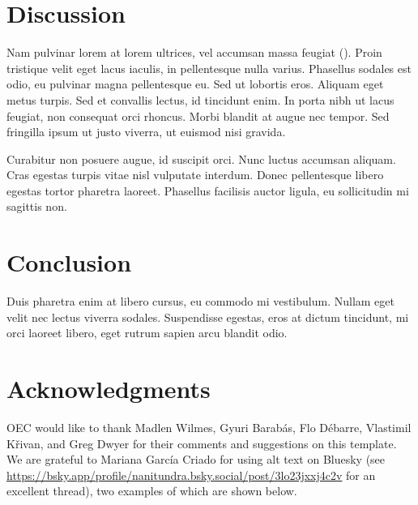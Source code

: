 ﻿\documentclass[11pt]{article}
\begin{document}
\section*{Discussion}

Nam pulvinar lorem at lorem ultrices, vel accumsan massa feugiat (\citealt{Ing11}). Proin tristique velit eget lacus iaculis, in pellentesque nulla varius. Phasellus sodales est odio, eu pulvinar magna pellentesque eu. Sed ut lobortis eros. Aliquam eget metus turpis. Sed et convallis lectus, id tincidunt enim. In porta nibh ut lacus feugiat, non consequat orci rhoncus. Morbi blandit at augue nec tempor. Sed fringilla ipsum ut justo viverra, ut euismod nisi gravida.

Curabitur non posuere augue, id suscipit orci. Nunc luctus accumsan aliquam. Cras egestas turpis vitae nisl vulputate interdum. Donec pellentesque libero egestas tortor pharetra laoreet. Phasellus facilisis auctor ligula, eu sollicitudin mi sagittis non.

\section*{Conclusion}

Duis pharetra enim at libero cursus, eu commodo mi vestibulum. Nullam eget velit nec lectus viverra sodales. Suspendisse egestas, eros at dictum tincidunt, mi orci laoreet libero, eget rutrum sapien arcu blandit odio.


\section*{Acknowledgments}

OEC would like to thank Madlen Wilmes, Gyuri Barab\'{a}s, Flo D\'{e}barre, Vlastimil K\v{r}ivan, and Greg Dwyer for their comments and suggestions on this template. We are grateful to Mariana García Criado for using alt text on Bluesky (see \url{https://bsky.app/profile/nanitundra.bsky.social/post/3lo23jxxj4c2v} for an excellent thread), two examples of which are shown below.

\end{document}
